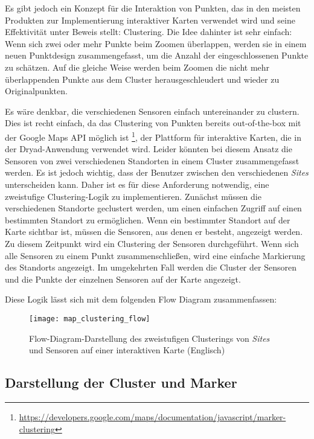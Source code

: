 Es gibt jedoch ein Konzept für die Interaktion von Punkten, das in den meisten Produkten zur Implementierung interaktiver Karten verwendet wird und seine Effektivität unter Beweis stellt: Clustering.
Die Idee dahinter ist sehr einfach: Wenn sich zwei oder mehr Punkte beim Zoomen überlappen, werden sie in einem neuen Punktdesign zusammengefasst, um die Anzahl der eingeschlossenen Punkte zu schätzen.
Auf die gleiche Weise werden beim Zoomen die nicht mehr überlappenden Punkte aus dem Cluster herausgeschleudert und wieder zu Originalpunkten.

Es wäre denkbar, die verschiedenen Sensoren einfach untereinander zu clustern. Dies ist recht einfach, da das Clustering von Punkten bereits out-of-the-box mit der Google Maps API möglich ist \footnote{\href{https://developers.google.com/maps/documentation/javascript/marker-clustering}{https://developers.google.com/maps/documentation/javascript/marker-clustering}}, der Plattform für interaktive Karten, die in der Dryad-Anwendung verwendet wird.
Leider könnten bei diesem Ansatz die Sensoren von zwei verschiedenen Standorten in einem Cluster zusammengefasst werden. Es ist jedoch wichtig, dass der Benutzer zwischen den verschiedenen \textit{Sites} unterscheiden kann.
Daher ist es für diese Anforderung notwendig, eine zweistufige Clustering-Logik zu implementieren.
Zunächst müssen die verschiedenen Standorte geclustert werden, um einen einfachen Zugriff auf einen bestimmten Standort zu ermöglichen.
Wenn ein bestimmter Standort auf der Karte sichtbar ist, müssen die Sensoren, aus denen er besteht, angezeigt werden.
Zu diesem Zeitpunkt wird ein Clustering der Sensoren durchgeführt.
Wenn sich alle Sensoren zu einem Punkt zusammenschließen, wird eine einfache Markierung des Standorts angezeigt.
Im umgekehrten Fall werden die Cluster der Sensoren und die Punkte der einzelnen Sensoren auf der Karte angezeigt.

Diese Logik lässt sich mit dem folgenden Flow Diagram zusammenfassen:
\begin{figure}[H]
  \centering
  \texttt{[image: map\_clustering\_flow]}
  \caption{Flow-Diagram-Darstellung des zweistufigen Clusterings von \textit{Sites} und Sensoren auf einer interaktiven Karte (Englisch)}
  \label{fig:map_clustering_flow}
\end{figure}

\subsection{Darstellung der Cluster und Marker}

